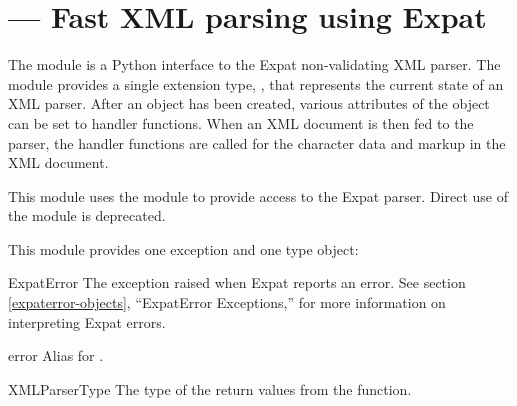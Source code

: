 \section{ ---
         Fast XML parsing using Expat}

%



The  module is a Python interface to the
Expat non-validating XML parser.
The module provides a single extension type, , that
represents the current state of an XML parser.  After an
 object has been created, various attributes of the object 
can be set to handler functions.  When an XML document is then fed to
the parser, the handler functions are called for the character data
and markup in the XML document.

This module uses the  module to
provide access to the Expat parser.  Direct use of the
 module is deprecated.

This module provides one exception and one type object:

\begin{excdesc}{ExpatError}
  The exception raised when Expat reports an error.  See section
  \ref{expaterror-objects}, ``ExpatError Exceptions,'' for more
  information on interpreting Expat errors.
\end{excdesc}

\begin{excdesc}{error}
  Alias for .
\end{excdesc}

\begin{datadesc}{XMLParserType}
  The type of the return values from the 
  function.
\end{datadesc}


